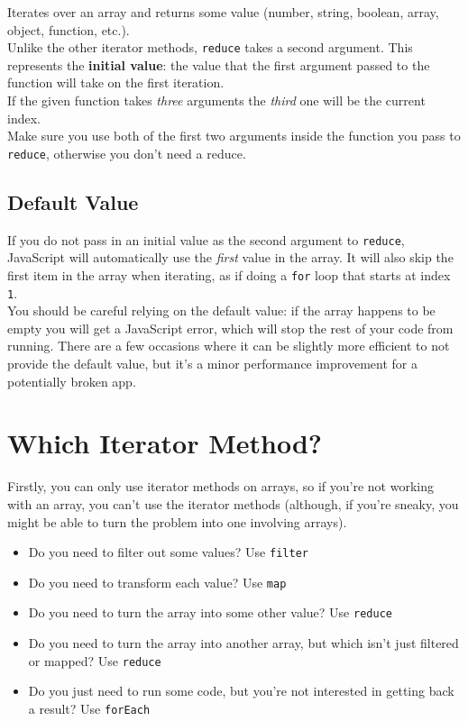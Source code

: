 Iterates over an array and returns some value (number, string, boolean, array, object, function, etc.).
\\

Unlike the other iterator methods, \texttt{reduce} takes a second argument. This represents the \textbf{initial value}: the value that the first argument passed to the function will take on the first iteration.
\\

If the given function takes \textit{three} arguments the \textit{third} one will be the current index.
\\

Make sure you use both of the first two arguments inside the function you pass to \texttt{reduce}, otherwise you don't need a reduce.

\subsection{Default Value}

If you do not pass in an initial value as the second argument to \texttt{reduce}, JavaScript will automatically use the \textit{first} value in the array. It will also skip the first item in the array when iterating, as if doing a \texttt{for} loop that starts at index \texttt{1}.
\\

You should be careful relying on the default value: if the array happens to be empty you will get a JavaScript error, which will stop the rest of your code from running. There are a few occasions where it can be slightly more efficient to not provide the default value, but it's a minor performance improvement for a potentially broken app.



\section{Which Iterator Method?}

Firstly, you can only use iterator methods on arrays, so if you're not working with an array, you can't use the iterator methods (although, if you're sneaky, you might be able to turn the problem into one involving arrays).

\begin{itemize}
    \item Do you need to filter out some values? Use \texttt{filter}
    \item Do you need to transform each value? Use \texttt{map}
    \item Do you need to turn the array into some other value? Use \texttt{reduce}
    \item Do you need to turn the array into another array, but which isn't just filtered or mapped? Use \texttt{reduce}
    \item Do you just need to run some code, but you're not interested in getting back a result? Use \texttt{forEach}
\end{itemize}

